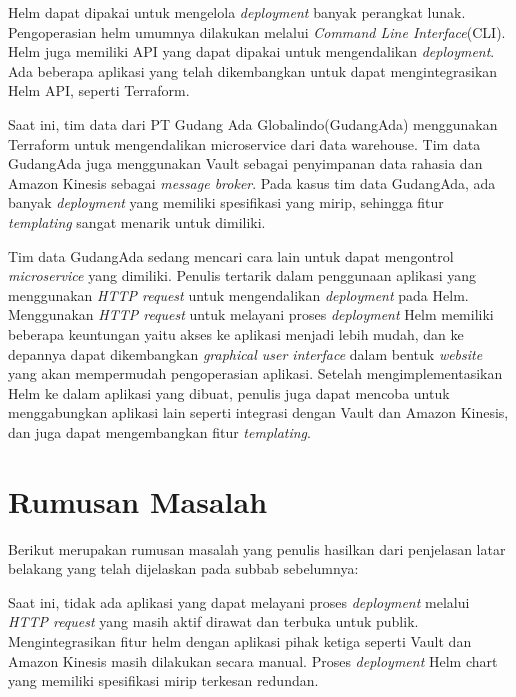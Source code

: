 Helm dapat dipakai untuk mengelola \textit{deployment} banyak perangkat lunak. Pengoperasian helm umumnya dilakukan melalui \textit{Command Line Interface}(CLI). Helm juga memiliki API yang dapat dipakai untuk mengendalikan \textit{deployment}. Ada beberapa aplikasi yang telah dikembangkan untuk dapat mengintegrasikan Helm API, seperti Terraform.

Saat ini, tim data dari PT Gudang Ada Globalindo(GudangAda) menggunakan Terraform untuk mengendalikan microservice dari \f{data warehouse}. Tim data GudangAda juga menggunakan Vault sebagai penyimpanan data rahasia dan Amazon Kinesis sebagai \textit{message broker}. Pada kasus tim data GudangAda, ada banyak \textit{deployment} yang memiliki spesifikasi yang mirip, sehingga fitur \textit{templating} sangat menarik untuk dimiliki.

Tim data GudangAda sedang mencari cara lain untuk dapat mengontrol \textit{microservice} yang dimiliki. Penulis tertarik dalam penggunaan aplikasi yang menggunakan \textit{HTTP request} untuk mengendalikan \textit{deployment} pada Helm. Menggunakan \textit{HTTP request} untuk melayani proses \textit{deployment} Helm memiliki beberapa keuntungan yaitu akses ke aplikasi menjadi lebih mudah, dan ke depannya dapat dikembangkan \textit{graphical user interface} dalam bentuk \textit{website} yang akan mempermudah pengoperasian aplikasi. Setelah mengimplementasikan Helm ke dalam aplikasi yang dibuat, penulis juga dapat mencoba untuk menggabungkan aplikasi lain seperti integrasi dengan Vault dan Amazon Kinesis, dan juga dapat mengembangkan fitur \textit{templating}.




\section{Rumusan Masalah}
\label{sec:masalah}
Berikut merupakan rumusan masalah yang penulis hasilkan dari penjelasan latar belakang yang telah dijelaskan pada subbab sebelumnya:

Saat ini, tidak ada aplikasi yang dapat melayani proses \textit{deployment} melalui \textit{HTTP request} yang masih aktif dirawat dan terbuka untuk publik. Mengintegrasikan fitur helm dengan aplikasi pihak ketiga seperti Vault dan Amazon Kinesis masih dilakukan secara manual. Proses \textit{deployment} Helm chart yang memiliki spesifikasi mirip terkesan redundan.

